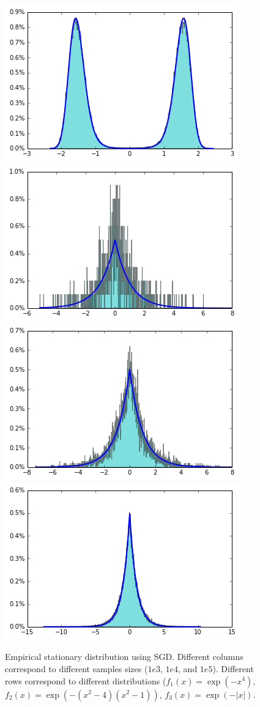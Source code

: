 \documentclass[preprint,12pt,3p]{elsarticle}
\begin{document}
\begin{figure}
    \includegraphics[width=.3\textwidth]{../figure/case2_step_0.005_iter_1e5.png}
    \includegraphics[width=.3\textwidth]{../figure/case3_step_0.005_iter_1e3.png}
    \includegraphics[width=.3\textwidth]{../figure/case3_step_0.005_iter_1e4.png}
    \includegraphics[width=.3\textwidth]{../figure/case3_step_0.005_iter_1e5.png}
    \caption{Empirical stationary distribution using SGD. Different columns correspond to different samples sizes ($1e3$, $1e4$, and $1e5$). Different rows correspond to different distributions ($f_1(x) = \exp(-x^4)$, $f_2(x) = \exp(-(x^2 - 4)(x^2 - 1))$, $f_3(x) = \exp(-|x|)$.}
    \label{Fig:exp1}
\end{figure}
\end{document}
